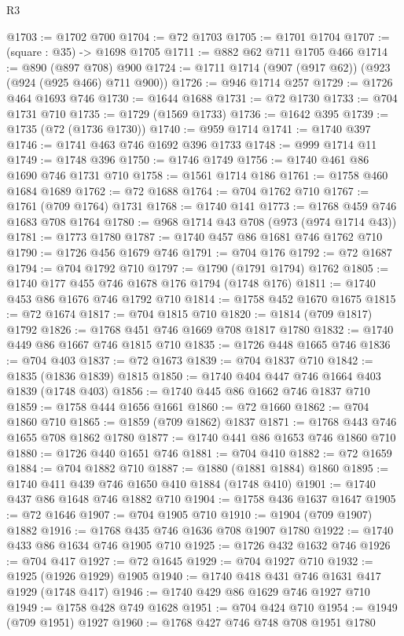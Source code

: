 \begin{lexlean}{R3}
\begin{coremodule}
@1703 := @1702 @700
@1704 := @72 @1703
@1705 := @1701 @1704
@1707 := (square : @35) -> @1698 @1705
@1711 := @882 @62 @711 @1705 @466
@1714 := @890 (@897 @708) @900
@1724 := @1711 @1714 (@907 (@917 @62)) (@923 (@924 (@925 @466) @711 @900))
@1726 := @946 @1714 @257
@1729 := @1726 @464 @1693 @746
@1730 := @1644 @1688
@1731 := @72 @1730
@1733 := @704 @1731 @710
@1735 := @1729 (@1569 @1733)
@1736 := @1642 @395
@1739 := @1735 (@72 (@1736 @1730))
@1740 := @959 @1714
@1741 := @1740 @397
@1746 := @1741 @463 @746 @1692 @396 @1733
@1748 := @999 @1714 @11
@1749 := @1748 @396
@1750 := @1746 @1749
@1756 := @1740 @461 @86 @1690 @746 @1731 @710
@1758 := @1561 @1714 @186
@1761 := @1758 @460 @1684 @1689
@1762 := @72 @1688
@1764 := @704 @1762 @710
@1767 := @1761 (@709 @1764) @1731
@1768 := @1740 @141
@1773 := @1768 @459 @746 @1683 @708 @1764
@1780 := @968 @1714 @43 @708 (@973 (@974 @1714 @43))
@1781 := @1773 @1780
@1787 := @1740 @457 @86 @1681 @746 @1762 @710
@1790 := @1726 @456 @1679 @746
@1791 := @704 @176
@1792 := @72 @1687
@1794 := @704 @1792 @710
@1797 := @1790 (@1791 @1794) @1762
@1805 := @1740 @177 @455 @746 @1678 @176 @1794 (@1748 @176)
@1811 := @1740 @453 @86 @1676 @746 @1792 @710
@1814 := @1758 @452 @1670 @1675
@1815 := @72 @1674
@1817 := @704 @1815 @710
@1820 := @1814 (@709 @1817) @1792
@1826 := @1768 @451 @746 @1669 @708 @1817 @1780
@1832 := @1740 @449 @86 @1667 @746 @1815 @710
@1835 := @1726 @448 @1665 @746
@1836 := @704 @403
@1837 := @72 @1673
@1839 := @704 @1837 @710
@1842 := @1835 (@1836 @1839) @1815
@1850 := @1740 @404 @447 @746 @1664 @403 @1839 (@1748 @403)
@1856 := @1740 @445 @86 @1662 @746 @1837 @710
@1859 := @1758 @444 @1656 @1661
@1860 := @72 @1660
@1862 := @704 @1860 @710
@1865 := @1859 (@709 @1862) @1837
@1871 := @1768 @443 @746 @1655 @708 @1862 @1780
@1877 := @1740 @441 @86 @1653 @746 @1860 @710
@1880 := @1726 @440 @1651 @746
@1881 := @704 @410
@1882 := @72 @1659
@1884 := @704 @1882 @710
@1887 := @1880 (@1881 @1884) @1860
@1895 := @1740 @411 @439 @746 @1650 @410 @1884 (@1748 @410)
@1901 := @1740 @437 @86 @1648 @746 @1882 @710
@1904 := @1758 @436 @1637 @1647
@1905 := @72 @1646
@1907 := @704 @1905 @710
@1910 := @1904 (@709 @1907) @1882
@1916 := @1768 @435 @746 @1636 @708 @1907 @1780
@1922 := @1740 @433 @86 @1634 @746 @1905 @710
@1925 := @1726 @432 @1632 @746
@1926 := @704 @417
@1927 := @72 @1645
@1929 := @704 @1927 @710
@1932 := @1925 (@1926 @1929) @1905
@1940 := @1740 @418 @431 @746 @1631 @417 @1929 (@1748 @417)
@1946 := @1740 @429 @86 @1629 @746 @1927 @710
@1949 := @1758 @428 @749 @1628
@1951 := @704 @424 @710
@1954 := @1949 (@709 @1951) @1927
@1960 := @1768 @427 @746 @748 @708 @1951 @1780

\end{coremodule}
\end{lexlean}
